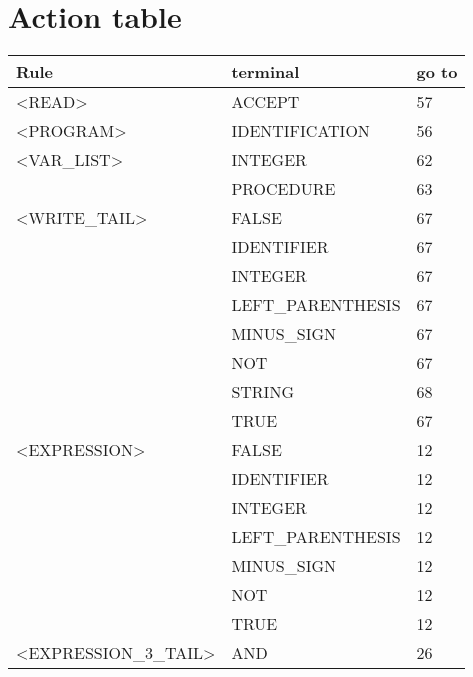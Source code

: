 \newpage\cleardoublepage{}
\section{Action table}
\label{app:action table}



\begin{longtable}{|l|l|l|}

\hline

\textbf{Rule}               &   \textbf{terminal}           &   \textbf{go to} \\ \hline
<READ>               &   ACCEPT               &   57 \\ \hline
<PROGRAM>            &   IDENTIFICATION       &   56 \\ \hline
<VAR\_LIST>           &   INTEGER              &   62 \\ \hline
                     &   PROCEDURE            &   63 \\ \hline
<WRITE\_TAIL>         &   FALSE                &   67 \\ \hline
                     &   IDENTIFIER           &   67 \\ \hline
                     &   INTEGER              &   67 \\ \hline
                     &   LEFT\_PARENTHESIS     &   67 \\ \hline
                     &   MINUS\_SIGN           &   67 \\ \hline
                     &   NOT                  &   67 \\ \hline
                     &   STRING               &   68 \\ \hline
                     &   TRUE                 &   67 \\ \hline
<EXPRESSION>         &   FALSE                &   12 \\ \hline
                     &   IDENTIFIER           &   12 \\ \hline
                     &   INTEGER              &   12 \\ \hline
                     &   LEFT\_PARENTHESIS     &   12 \\ \hline
                     &   MINUS\_SIGN           &   12 \\ \hline
                     &   NOT                  &   12 \\ \hline
                     &   TRUE                 &   12 \\ \hline
<EXPRESSION\_3\_TAIL>  &   AND                 &   26 \\ \hline

\end{longtable}
